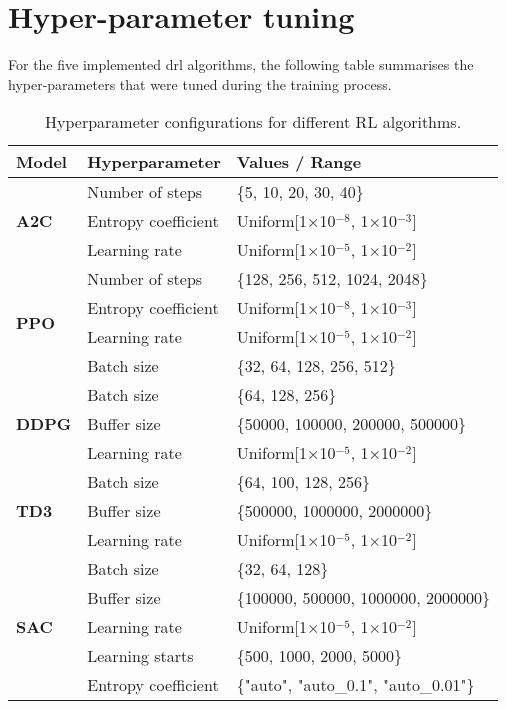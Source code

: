 \chapter{Hyper-parameter tuning} \label{app:hyperparameter_tuning}

For the five implemented \acrlong{drl} algorithms, the following table summarises the hyper-parameters that were tuned during the training process.

\begin{table}[h!]
\centering
\begin{tabular}{|l|l|p{8cm}|}
\hline
\textbf{Model} & \textbf{Hyperparameter} & \textbf{Values / Range} \\ \hline
\multirow{3}{*}{\textbf{A2C}} 
 & Number of steps & \{5, 10, 20, 30, 40\} \\
 & Entropy coefficient & Uniform[1$\times$10$^{-8}$, 1$\times$10$^{-3}$] \\ 
 & Learning rate & Uniform[1$\times$10$^{-5}$, 1$\times$10$^{-2}$] \\ \hline

\multirow{4}{*}{\textbf{PPO}} 
 & Number of steps & \{128, 256, 512, 1024, 2048\} \\ 
 & Entropy coefficient & Uniform[1$\times$10$^{-8}$, 1$\times$10$^{-3}$] \\ 
 & Learning rate & Uniform[1$\times$10$^{-5}$, 1$\times$10$^{-2}$] \\ 
 & Batch size & \{32, 64, 128, 256, 512\} \\ \hline

\multirow{3}{*}{\textbf{DDPG}} 
 & Batch size & \{64, 128, 256\} \\ 
 & Buffer size & \{50000, 100000, 200000, 500000\} \\ 
 & Learning rate & Uniform[1$\times$10$^{-5}$, 1$\times$10$^{-2}$] \\ \hline

\multirow{3}{*}{\textbf{TD3}} 
 & Batch size & \{64, 100, 128, 256\} \\ 
 & Buffer size & \{500000, 1000000, 2000000\} \\ 
 & Learning rate & Uniform[1$\times$10$^{-5}$, 1$\times$10$^{-2}$] \\ \hline

\multirow{5}{*}{\textbf{SAC}} 
 & Batch size & \{32, 64, 128\} \\ 
 & Buffer size & \{100000, 500000, 1000000, 2000000\} \\ 
 & Learning rate & Uniform[1$\times$10$^{-5}$, 1$\times$10$^{-2}$] \\ 
 & Learning starts & \{500, 1000, 2000, 5000\} \\ 
 & Entropy coefficient & \{"auto", "auto\_0.1", "auto\_0.01"\} \\ \hline
\end{tabular}
\caption{Hyperparameter configurations for different RL algorithms.}
\label{tab:model_hyperparameters}
\end{table}